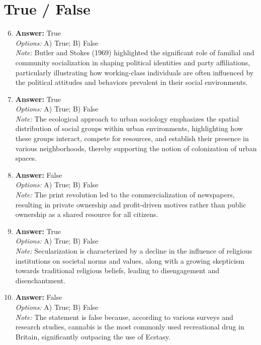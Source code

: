 \documentclass[12pt]{article}
\begin{document}
\section*{True / False}
\begin{enumerate}[label=\arabic*.]
\setcounter{enumi}{5}
\item \textbf{Answer:} True
\\ \textit{Options:} A) True; B) False
\\ \textit{Note:} Butler and Stokes (1969) highlighted the significant role of familial and community socialization in shaping political identities and party affiliations, particularly illustrating how working-class individuals are often influenced by the political attitudes and behaviors prevalent in their social environments.
\item \textbf{Answer:} True
\\ \textit{Options:} A) True; B) False
\\ \textit{Note:} The ecological approach to urban sociology emphasizes the spatial distribution of social groups within urban environments, highlighting how these groups interact, compete for resources, and establish their presence in various neighborhoods, thereby supporting the notion of colonization of urban spaces.
\item \textbf{Answer:} False
\\ \textit{Options:} A) True; B) False
\\ \textit{Note:} The print revolution led to the commercialization of newspapers, resulting in private ownership and profit-driven motives rather than public ownership as a shared resource for all citizens.
\item \textbf{Answer:} True
\\ \textit{Options:} A) True; B) False
\\ \textit{Note:} Secularization is characterized by a decline in the influence of religious institutions on societal norms and values, along with a growing skepticism towards traditional religious beliefs, leading to disengagement and disenchantment.
\item \textbf{Answer:} False
\\ \textit{Options:} A) True; B) False
\\ \textit{Note:} The statement is false because, according to various surveys and research studies, cannabis is the most commonly used recreational drug in Britain, significantly outpacing the use of Ecstasy.
\end{enumerate}
\end{document}
